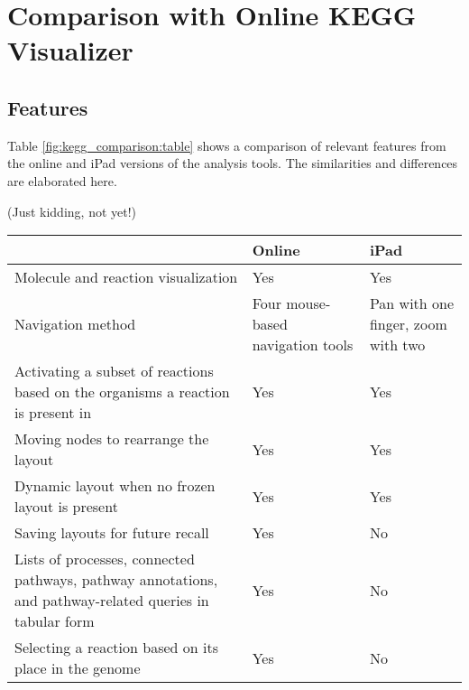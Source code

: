 \section{Comparison with Online KEGG Visualizer}
\label{sect:kegg_comparison}

\subsection{Features}
\label{sect:kegg_comparison_features}

Table \ref{fig:kegg_comparison:table} shows a comparison of relevant features
from the online and iPad versions of the \pathcasekegg analysis tools. The
similarities and differences are elaborated here.

(Just kidding, not yet!)

\begin{table}[ht!]
\centering
\begin{tabular}{ | p{3in} | p{1in} | p{1in} | }
    \hline
                        & Online    & iPad \\ \hline

    Molecule and reaction visualization
                        & Yes       & Yes \\ \hline

    Navigation method   & Four mouse-based navigation tools
                                    & Pan with one finger, zoom with two
                                    \\ \hline

    Activating a subset of reactions based on the organisms a reaction is
    present in
                        & Yes       & Yes \\ \hline

    Moving nodes to rearrange the layout
                        & Yes       & Yes \\ \hline

    Dynamic layout when no frozen layout is present
                        & Yes       & Yes \\ \hline

    Saving layouts for future recall
                        & Yes       & No \\ \hline

    Lists of processes, connected pathways, pathway annotations, and
    pathway-related queries in tabular form
                        & Yes       & No \\ \hline

    Selecting a reaction based on its place in the genome
                        & Yes       & No \\ \hline


\end{tabular}
\end{table}
